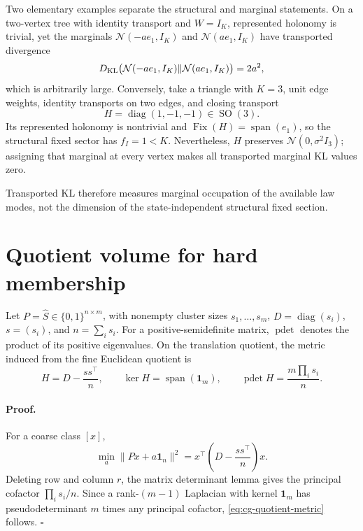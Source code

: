 Two elementary examples separate the structural and marginal statements.
On a two-vertex tree with identity transport and \(W=I_K\), represented
holonomy is trivial, yet the marginals
\(\mathcal N(-ae_1,I_K)\) and \(\mathcal N(ae_1,I_K)\) have transported
divergence
\begin{equation}
D_{\mathrm{KL}}\bigl(\mathcal N(-ae_1,I_K)\Vert
\mathcal N(ae_1,I_K)\bigr)=2a^2,
\label{eq:cg-trivial-holonomy-large-kl}
\end{equation}
which is arbitrarily large. Conversely, take a triangle with \(K=3\), unit
edge weights, identity transports on two edges, and closing transport
\begin{equation}
H=\operatorname{diag}(1,-1,-1)\in\operatorname{SO}(3).
\label{eq:cg-isotropic-holonomy-counterexample}
\end{equation}
Its represented holonomy is nontrivial and
\(\operatorname{Fix}(H)=\operatorname{span}(e_1)\), so the structural fixed
sector has \(f_I=1<K\). Nevertheless, \(H\) preserves
\(\mathcal N(0,\sigma^2I_3)\); assigning that marginal at every vertex makes
all transported marginal KL values zero. 

Transported KL therefore measures marginal occupation of the available law
modes, not the dimension of the state-independent structural fixed section.

\section{Quotient volume for hard membership}
\label{sec:cg-quotient-volume}

Let \(P=\widehat S\in\{0,1\}^{n\times m}\), with nonempty cluster sizes
\(s_1,\ldots,s_m\), \(D=\operatorname{diag}(s_i)\),
\(s=(s_i)\), and \(n=\sum_i s_i\). For a positive-semidefinite matrix,
\(\operatorname{pdet}\) denotes the product of its positive eigenvalues.
On the translation quotient, the metric
induced from the fine Euclidean quotient is
\begin{equation}
H=D-\frac{ss^\top}{n},\qquad
\ker H=\operatorname{span}(\mathbf1_m),\qquad
\operatorname{pdet}H=\frac{m\prod_i s_i}{n}.
\label{eq:cg-quotient-metric}
\end{equation}

\paragraph{Proof.}
For a coarse class \([x]\),
\[
\min_a\|Px+a\mathbf1_n\|^2
=x^\top\left(D-\frac{ss^\top}{n}\right)x.
\]
Deleting row and column \(r\), the matrix determinant lemma gives the
principal cofactor \(\prod_i s_i/n\). Since a rank-\((m-1)\) Laplacian with
kernel \(\mathbf1_m\) has pseudodeterminant \(m\) times any principal
cofactor, \eqref{eq:cg-quotient-metric} follows. \(\square\)


